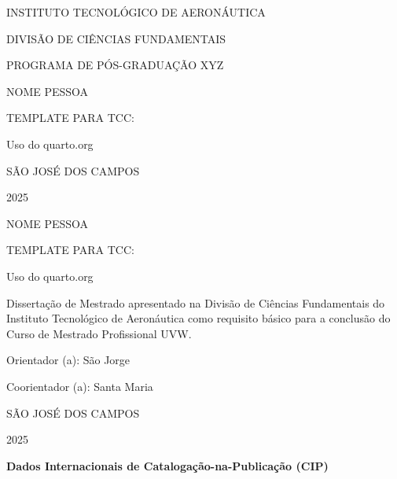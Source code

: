 \documentclass[
  12pt,
  oneside,
  a4paper,
  english,
  brazil]{abntex2}
\author{}
\date{}
\begin{document}
\setlength{\parindent}{0mm}
\ABNTEXchapterfont\normalsize

\ABNTEXchapterfont\normalsize

\begin{center}
\uppercase{ Instituto Tecnológico de Aeronáutica }

\uppercase{ Divisão de Ciências Fundamentais }

\uppercase{ Programa de Pós-Graduação XYZ }

\vfill

\uppercase{ Nome Pessoa }

\vfill

\uppercase{ Template para TCC: }

Uso do quarto.org

\vfill

\uppercase{ São José dos Campos }

2025

\end{center}

\newpage{}

\begin{center}
\uppercase{ Nome Pessoa }

\vspace{6cm}

\uppercase{ Template para TCC: }

Uso do quarto.org

\vspace{3cm}

\hfill\begin{minipage}{0.5\textwidth}
Dissertação de Mestrado apresentado na Divisão de Ciências Fundamentais do Instituto Tecnológico de Aeronáutica como requisito básico para a conclusão do Curso de Mestrado Profissional UVW.

\vspace{1cm}

Orientador (a): São Jorge

Coorientador (a): Santa Maria

\end{minipage}

\vfill

\uppercase{ São José dos Campos }

2025

\end{center}

\newpage{}

\textbf{Dados Internacionais de Catalogação-na-Publicação (CIP)}
\end{document}
